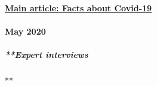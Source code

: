 \hypertarget{main-article-facts-about-covid-19}{%
\paragraph{\texorpdfstring{\href{https://swprs.org/a-swiss-doctor-on-covid-19/}{Main
article: Facts about
Covid-19}}{Main article: Facts about Covid-19}}\label{main-article-facts-about-covid-19}}

\hypertarget{may-2020}{%
\paragraph{May 2020}\label{may-2020}}

\hypertarget{expert-interviews}{%
\subparagraph{**Expert interviews}\label{expert-interviews}}

**

